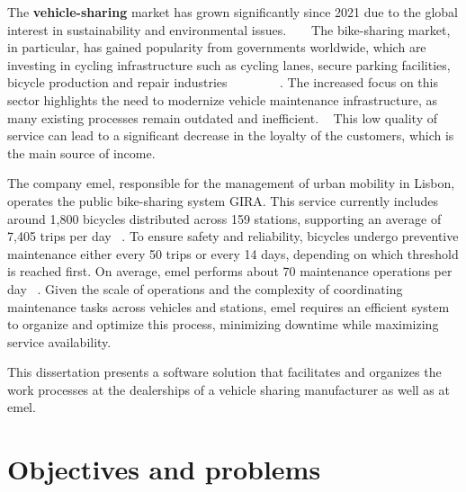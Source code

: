 The \textbf{vehicle-sharing} market has grown significantly since 2021 due to the global interest in sustainability and environmental issues. ~\cite{cohesionOpenData} ~\cite{bike_data_businessresearch}
The bike-sharing market, in particular, has gained popularity from governments worldwide, which are investing in cycling infrastructure such as cycling lanes, secure parking facilities, bicycle production and repair industries ~\cite{Clercq2023} ~\cite{Cerro2024} ~\cite{European_declararion_on_cycling} ~\cite{bike_data_businessresearch} ~\cite{cohesionOpenData}.
The increased focus on this sector highlights the need to modernize vehicle maintenance infrastructure, as many existing processes remain outdated and inefficient. ~\cite{MAS_MOTORS}
This low quality of service can lead to a significant decrease in the loyalty of the customers, which is the main source of income. ~\cite{Setting_the_after_sale_process}


The company \ac{emel}, responsible for the management of urban mobility in Lisbon, operates the public bike-sharing system GIRA. This service currently includes around 1,800 bicycles distributed across 159 stations, supporting an average of 7,405 trips per day ~\cite{Gira_Trips}. To ensure safety and reliability, bicycles undergo preventive maintenance either every 50 trips or every 14 days, depending on which threshold is reached first. On average, \ac{emel} performs about 70 maintenance operations per day ~\cite{Gira_Maintenance}. Given the scale of operations and the complexity of coordinating maintenance tasks across vehicles and stations, \ac{emel} requires an efficient system to organize and optimize this process, minimizing downtime while maximizing service availability.

This dissertation presents a software solution that facilitates and organizes the work processes at the dealerships of a vehicle sharing manufacturer as well as at \ac{emel}. 


\section{Objectives and problems}

